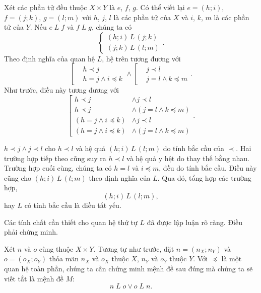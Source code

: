 Xét các phần tử đều thuộc $X \times Y$ là $e$, $f$, $g$. Có thể viết lại $e = (h; i)$, $f = (j; k)$, $g = (l; m)$ với $h$, $j$, $l$ là các phần tử của $X$ và $i$, $k$, $m$ là các phần tử của $Y$. Nếu $e\;L\;f$ và $f\;L\;g$, chúng ta có
$$
\begin{cases}
   (h; i)\,L\,(j; k) \\
   (j; k)\,L\,(l; m)
\end{cases}.
$$
Theo định nghĩa của quan hệ $L$, hệ trên tương đương với
$$
\left[ \begin{aligned} &h \prec j \\ &h = j \land i \preccurlyeq k \end{aligned} \right. \land
\left[ \begin{aligned} &j \prec l \\ &j = l \land k \preccurlyeq m \end{aligned} \right..
$$
Như trước, điều này tương đương với 
$$
\left[
   \begin{aligned}
      h \prec j &\land j \prec l \\
      h \prec j &\land (j = l \land k \preccurlyeq m) \\
      (h = j \land i \preccurlyeq k) &\land j \prec l \\
      (h = j \land i \preccurlyeq k) &\land (j = l \land k \preccurlyeq m)
   \end{aligned}
\right..
$$

$h \prec j \land j \prec l$ cho $h \prec l$ và hệ quả  $(h; i)\,L\,(l; m)$ do tính bắc cầu của $\prec$. Hai trường hợp tiếp theo cũng suy ra $h \prec l$ và hệ quả y hệt do thay thế bằng nhau. Trường hợp cuối cùng, chúng ta có $h = l$ và $i \preccurlyeq m$, đều do tính bắc cầu. Điều này cũng cho $(h; i)\,L\,(l; m)$ theo định nghĩa của $L$. Qua đó, tổng hợp các trường hợp, 
\begin{equation*}
   (h; i)\,L\,(l; m),
\end{equation*}
hay $L$ có tính bắc cầu là điều tất yếu.

Các tính chất cần thiết cho quan hệ thứ tự $L$ đã được lập luận rõ ràng. Điều phải chứng minh.

\stepSubexercise Xét $n$ và $o$ cùng thuộc $X \times Y$. Tương tự như trước, đặt $n = (n_X; n_Y)$ và $o = (o_X; o_Y)$ thỏa mãn $n_X$ và $o_X$ thuộc $X$, $n_Y$ và $o_Y$ thuộc $Y$. Với $\preccurlyeq$ là một quan hệ toàn phần, chúng ta cần chứng minh mệnh đề sau đúng mà chúng ta sẽ viết tắt là mệnh đề $M$:
\begin{equation*}
   n\;L\;o \lor o\;L\;n.
\end{equation*}

